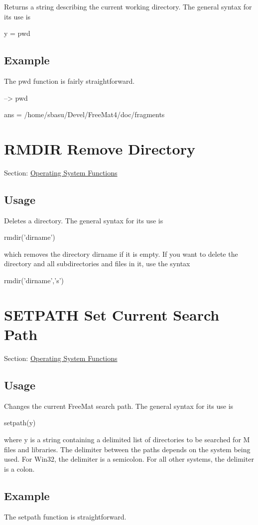 Returns a {\ttfamily string} describing the current working directory. The general syntax for its use is \begin{DoxyVerb}  y = pwd
\end{DoxyVerb}
\hypertarget{variables_struct_Example}{}\subsection{Example}\label{variables_struct_Example}
The {\ttfamily pwd} function is fairly straightforward.


\begin{DoxyVerbInclude}
--> pwd

ans = 
/home/sbasu/Devel/FreeMat4/doc/fragments
\end{DoxyVerbInclude}
 \hypertarget{os_rmdir}{}\section{R\-M\-D\-I\-R Remove Directory}\label{os_rmdir}
Section\-: \hyperlink{sec_os}{Operating System Functions} \hypertarget{vtkwidgets_vtkxyplotwidget_Usage}{}\subsection{Usage}\label{vtkwidgets_vtkxyplotwidget_Usage}
Deletes a directory. The general syntax for its use is \begin{DoxyVerb}  rmdir('dirname')
\end{DoxyVerb}
 which removes the directory {\ttfamily dirname} if it is empty. If you want to delete the directory and all subdirectories and files in it, use the syntax \begin{DoxyVerb}  rmdir('dirname','s')
\end{DoxyVerb}
 \hypertarget{os_setpath}{}\section{S\-E\-T\-P\-A\-T\-H Set Current Search Path}\label{os_setpath}
Section\-: \hyperlink{sec_os}{Operating System Functions} \hypertarget{vtkwidgets_vtkxyplotwidget_Usage}{}\subsection{Usage}\label{vtkwidgets_vtkxyplotwidget_Usage}
Changes the current Free\-Mat search path. The general syntax for its use is \begin{DoxyVerb}  setpath(y)
\end{DoxyVerb}
 where {\ttfamily y} is a {\ttfamily string} containing a delimited list of directories to be searched for M files and libraries. The delimiter between the paths depends on the system being used. For Win32, the delimiter is a semicolon. For all other systems, the delimiter is a colon.\hypertarget{variables_struct_Example}{}\subsection{Example}\label{variables_struct_Example}
The {\ttfamily setpath} function is straightforward.


